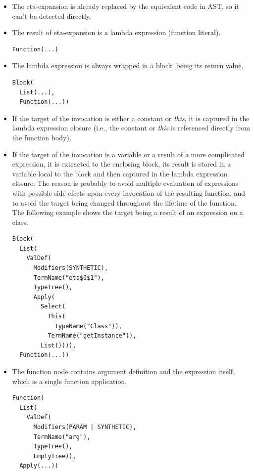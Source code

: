 \begin{itemize}
	\item The eta-expansion is already replaced by the equivalent code in AST, so it can't be detected directly.
	\item The result of eta-expansion is a lambda expression (function literal).
\lstset{style=Dump}
\begin{lstlisting}
Function(...)
\end{lstlisting}
	\item The lambda expression is always wrapped in a block, being its return value.
	
\lstset{style=Dump}
\begin{lstlisting}
Block(
  List(...), 
  Function(...))
\end{lstlisting}	
	
	\item If the target of the invocation is either a constant or \textit{this}, it is captured in the lambda expression closure (i.e., the constant or \textit{this} is referenced directly from the function body).
	
	\item If the target of the invocation is a variable or a result of a more complicated expression, it is extracted to the enclosing block, its result is stored in a variable local to the block and then captured in the lambda expression closure. The reason is probably to avoid multiple evaluation of expressions with possible side-efects upon every invocation of the resulting function, and to avoid the target being changed throughout the lifetime of the function. The following example shows the target being a result of an expression  on a  class.
	
\lstset{style=Dump}
\begin{lstlisting}
Block(
  List(
    ValDef(
      Modifiers(SYNTHETIC), 
      TermName("eta$0$1"), 
      TypeTree(), 
      Apply(
        Select(
          This(
            TypeName("Class")), 
          TermName("getInstance")), 
        List()))), 
  Function(...))
\end{lstlisting}

	\item The function node contains argument definition and the expression itself, which is a single function application.

\lstset{style=Dump}
\begin{lstlisting}
Function(
  List(
    ValDef(
      Modifiers(PARAM | SYNTHETIC), 
      TermName("arg"), 
      TypeTree(), 
      EmptyTree)), 
  Apply(...))
\end{lstlisting}
\end{itemize}


